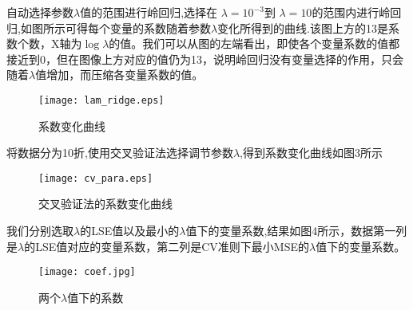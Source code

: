自动选择参数$\lambda$值的范围进行岭回归,选择在 $\lambda =10^{-3}$到 $\lambda = 10$的范围内进行岭回归,如图所示可得每个变量的系数随着参数$\lambda$变化所得到的曲线.该图上方的13是系数个数，X轴为$\log \lambda$的值。我们可以从图的左端看出，即使各个变量系数的值都接近到0，但在图像上方对应的值仍为13，说明岭回归没有变量选择的作用，只会随着$\lambda$值增加，而压缩各变量系数的值。
\begin{figure}[htbp]
  \centering
  \texttt{[image: lam\_ridge.eps]}
  \caption{系数变化曲线}
\end{figure}

将数据分为10折,使用交叉验证法选择调节参数$\lambda$,得到系数变化曲线如图3所示
\begin{figure}[htbp]
  \centering
  \texttt{[image: cv\_para.eps]}
  \caption{交叉验证法的系数变化曲线}
\end{figure}

我们分别选取$\lambda$的LSE值以及最小的$\lambda$值下的变量系数,结果如图4所示，数据第一列是$\lambda$的LSE值对应的变量系数，第二列是CV准则下最小MSE的$\lambda$值下的变量系数。
\begin{figure}[htbp]
  \centering
  \texttt{[image: coef.jpg]}
  \caption{两个$\lambda$值下的系数}
\end{figure}
